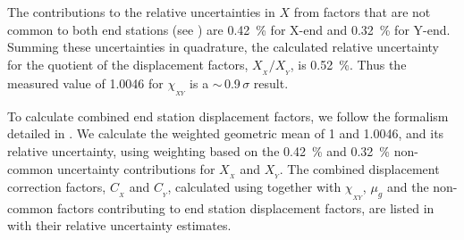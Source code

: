\documentclass[12pt,a4paper,final]{iopart}
\begin{document}
The contributions to the relative uncertainties in $X$ from factors that are not common to both end stations (see ) are \SI{0.42}{\percent} for X-end and \SI{0.32}{\percent} for Y-end.  Summing these uncertainties in quadrature, the calculated relative uncertainty for the quotient of the displacement factors, $X_{_X} / X_{_Y}$, is \SI{0.52}{\percent}.  Thus the measured value of 1.0046 for $\chi_{_{XY}}$ is a $\sim$\,0.9\,$\sigma$ result.

To calculate combined end station displacement factors, we follow the formalism detailed in .  We  calculate the weighted geometric mean of 1 and 1.0046, and its relative uncertainty,  using weighting based on the  \SI{0.42}{\percent} and \SI{0.32}{\percent} non-common uncertainty contributions for $X_{_X}$ and $X_{_Y}$.  The combined displacement correction factors, $C_{_{X}}$ and $C_{_{Y}}$, calculated using  together with $\chi_{_{XY}}$, $\mu_{g}$ and the non-common factors contributing to end station displacement factors, are listed in  with their relative uncertainty estimates.
%
\end{document}
